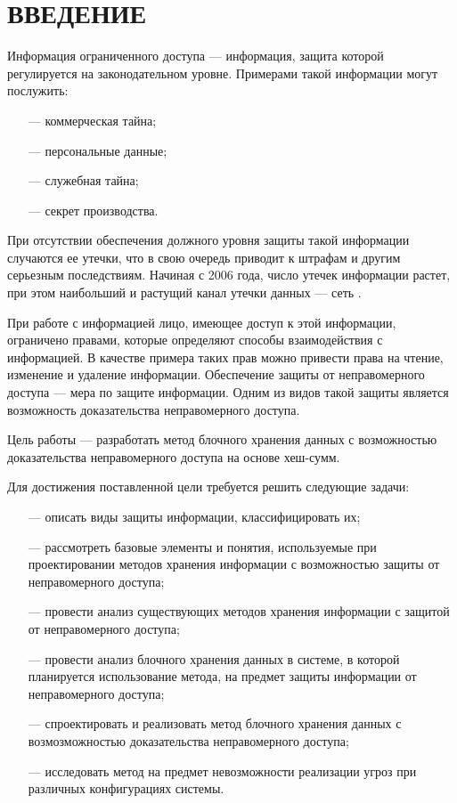 \section*{ВВЕДЕНИЕ}

Информация ограниченного доступа --- информация, защита которой регулируется на законодательном уровне. Примерами такой информации могут послужить:
\begin{itemize}
    \item [---] коммерческая тайна;
    \item [---] персональные данные;
    \item [---] служебная тайна;
    \item [---] секрет производства.
\end{itemize}

При отсутствии обеспечения должного уровня защиты такой информации случаются ее утечки, что в свою очередь приводит к штрафам и другим серьезным последствиям. Начиная с 2006 года, число утечек информации растет, при этом наибольший и растущий канал утечки данных --- сеть \cite{infowatch}.

При работе с информацией лицо, имеющее доступ к этой информации, ограничено правами, которые определяют способы взаимодействия с информацией. В качестве примера таких прав можно привести права на чтение, изменение и удаление информации. Обеспечение защиты от неправомерного доступа --- мера по защите информации. Одним из видов такой защиты является возможность доказательства неправомерного доступа.

Цель работы --- разработать метод блочного хранения данных с возможностью доказательства неправомерного доступа на основе хеш-сумм.

Для достижения поставленной цели требуется решить следующие задачи:
\begin{itemize}
	\item [---] описать виды защиты информации, классифицировать их;
	\item [---] рассмотреть базовые элементы и понятия, используемые при проектировании методов хранения информации с возможностью защиты от неправомерного доступа;
	\item [---] провести анализ существующих методов хранения информации с защитой от неправомерного доступа;
	\item [---] провести анализ блочного хранения данных в системе, в которой планируется использование метода, на предмет защиты информации от неправомерного доступа;
	\item [---] спроектировать и реализовать метод блочного хранения данных с возмозможностью доказательства неправомерного доступа;
	\item [---] исследовать метод на предмет невозможности реализации угроз при различных конфигурациях системы.
\end{itemize}
\pagebreak